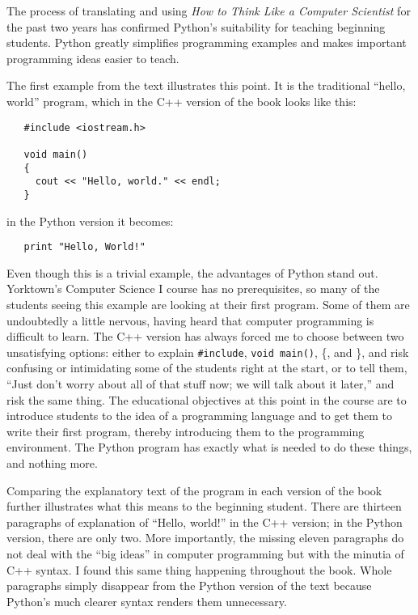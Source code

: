 The process of translating and using {\em How to Think Like a Computer
Scientist} for the past two years has confirmed Python's suitability
for teaching beginning students.  Python greatly simplifies
programming examples and makes important programming ideas easier to
teach.

The first example from the text illustrates this point.
It is the traditional ``hello, world'' program, which in the C++
version of the book looks like this:

\begin{verbatim}
   #include <iostream.h>

   void main()
   {
     cout << "Hello, world." << endl;
   }
\end{verbatim}

in the Python version it becomes:

\begin{verbatim}
   print "Hello, World!"
\end{verbatim}

Even though this is a trivial example, the advantages of Python stand
out.  Yorktown's Computer Science I course has no prerequisites, so
many of the students seeing this example are looking at their first
program.  Some of them are undoubtedly a little nervous, having heard
that computer programming is difficult to learn. The C++ version has
always forced me to choose between two unsatisfying options: either to
explain {\tt \#include}, {\tt void main()}, \{, and \},
and risk confusing or intimidating some of the students right at the
start, or to tell them, ``Just don't worry about all of that stuff
now; we will talk about it later,'' and risk the same thing.  The
educational objectives at this point in the course are to introduce
students to the idea of a programming language and to get them to
write their first program, thereby introducing them to the programming
environment.  The Python program has exactly what is needed to do these
things, and nothing more.

Comparing the explanatory text of the program in each version of
the book further illustrates what this means to the beginning student.
There are thirteen paragraphs of explanation of ``Hello, world!'' in the
C++ version; in the Python version, there are only two. More importantly,
the missing eleven paragraphs do not deal with the ``big ideas'' in
computer programming but with the minutia of C++ syntax.  I found this
same thing happening throughout the book.  Whole paragraphs simply
disappear from the Python version of the text because Python's much
clearer syntax renders them unnecessary.

